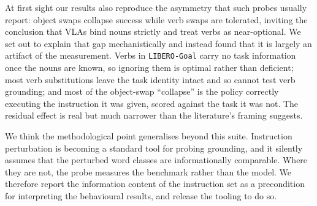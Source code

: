 \documentclass[11pt]{article}
\begin{document}
At first sight our results also reproduce the asymmetry that such probes usually
report: object swaps collapse success while verb swaps are tolerated, inviting the
conclusion that VLAs bind nouns strictly and treat verbs as near-optional. We set
out to explain that gap mechanistically and instead found that it is largely an
artifact of the measurement. Verbs in \texttt{LIBERO-Goal} carry no task
information once the nouns are known, so ignoring them is optimal rather than
deficient; most verb substitutions leave the task identity intact and so cannot
test verb grounding; and most of the object-swap ``collapse'' is the policy
correctly executing the instruction it was given, scored against the task it was
not. The residual effect is real but much narrower than the literature's framing
suggests.

We think the methodological point generalises beyond this suite. Instruction
perturbation is becoming a standard tool for probing grounding, and it silently
assumes that the perturbed word classes are informationally comparable. Where they
are not, the probe measures the benchmark rather than the model. We therefore
report the information content of the instruction set as a precondition for
interpreting the behavioural results, and release the tooling to do so.
\end{document}
